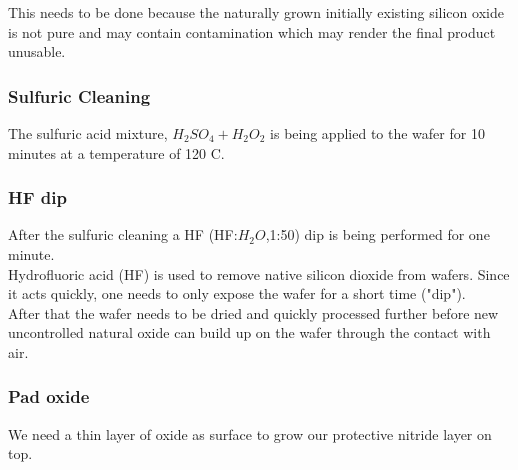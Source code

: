 This needs to be done because the naturally grown initially existing silicon oxide is not pure and may contain contamination which may render the final product unusable.

\subsubsection{Sulfuric Cleaning}
The sulfuric acid mixture, $H_2 S O_4 + H_2 O_2$ is being applied to the wafer for 10 minutes at a temperature of 120 \degree C.

\subsubsection{HF dip}
After the sulfuric cleaning a HF (HF:$H_2O$,1:50) dip is being performed for one minute. \\
Hydrofluoric acid (HF) is used to remove native silicon dioxide from wafers. Since it acts quickly, one needs to only expose the wafer for a short time ("dip"). \\
After that the wafer needs to be dried and quickly processed further before new uncontrolled natural oxide can build up on the wafer through the contact with air.

\subsubsection{Pad oxide}
We need a thin layer of oxide as surface to grow our protective nitride layer on top.

